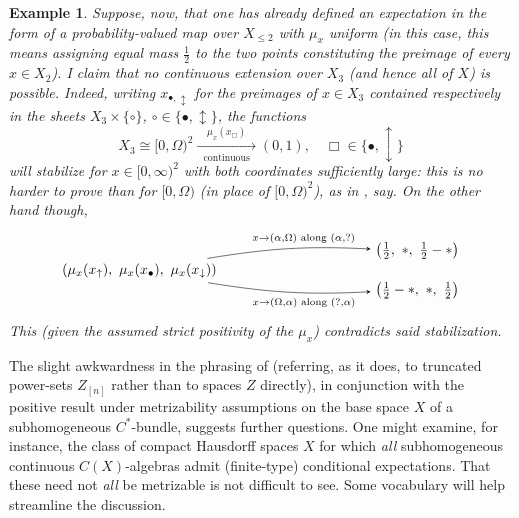 \documentclass[11pt,leqno]{article}
\theoremstyle{plain}
\theoremstyle{plain}
\theoremstyle{plain}
\newtheorem{example}[lemma]{Example}
\numberwithin{equation}{section}
\theoremstyle{nonumberplain}
\newcommand\1{{\bf 1}}
\renewcommand{\square}{\mathrel{\Box}}
\begin{document}
\begin{example}
  Suppose, now, that one has already defined an expectation in the form of a probability-valued map  over $X_{\le 2}$ with $\mu_x$ uniform (in this case, this means assigning equal mass $\frac 12$ to the two points constituting the preimage of every $x\in X_2$). I claim that no continuous extension  over $X_3$ (and hence all of $X$) is possible. Indeed, writing $x_{\bullet,\updownarrow}$ for the preimages of $x\in X_3$ contained respectively in the sheets $X_3\times \{\circ\}$, $\circ\in \{\bullet,\updownarrow\}$, the functions
  \begin{equation*}
    X_3\cong [0,\Omega)^2
    \xrightarrow[\text{continuous}]{\quad\mu_{x}(x_{\square})\quad}
    (0,1)
    ,\quad
    \square\in\{\bullet,\updownarrow\}
  \end{equation*}
  will stabilize for $x\in [0,\infty)^2$ with both coordinates sufficiently large: this is no harder to prove than for $[0,\Omega)$ (in place of $[0,\Omega)^2$), as in \cite[Example 43 12.]{ss_countertop}, say. On the other hand though, 
  \begin{equation*}
    \begin{tikzpicture}[>=stealth,auto,baseline=(current  bounding  box.center)]
      \path[anchor=base] 
      (0,0) node (l) {$(\mu_x(x_{\uparrow}),\ \mu_x(x_{\bullet}),\ \mu_x(x_{\downarrow}))$}
      +(7,.5) node (u) {$\left(\frac 12,\ *,\ \frac 12-*\right)$}
      +(7,-.5) node (d) {$\left(\frac 12-*,\ *,\ \frac 12\right)$}
      ;
      \draw[->] (l) to[bend left=6] node[pos=.6,auto] {$\scriptstyle x\to(\alpha,\Omega)\text{ along }(\alpha,?)$} (u);
      \draw[->] (l) to[bend right=6] node[pos=.6,auto,swap] {$\scriptstyle x\to(\Omega,\alpha)\text{ along }(?,\alpha)$} (d);
    \end{tikzpicture}
  \end{equation*}
  This (given the assumed strict positivity of the $\mu_x$) contradicts said stabilization.
\end{example}

The slight awkwardness in the phrasing of  (referring, as it does, to truncated power-sets $Z_{[n]}$ rather than to spaces $Z$ directly), in conjunction with the positive result \cite[Theorem 2.12]{2409.03531v1} under metrizability assumptions on the base space $X$ of a subhomogeneous $C^*$-bundle, suggests further questions. One might examine, for instance, the class of compact Hausdorff spaces $X$ for which {\it all} subhomogeneous continuous $C(X)$-algebras admit (finite-type) conditional expectations. That these need not {\it all} be metrizable is not difficult to see. Some vocabulary will help streamline the discussion. 
\end{document}
